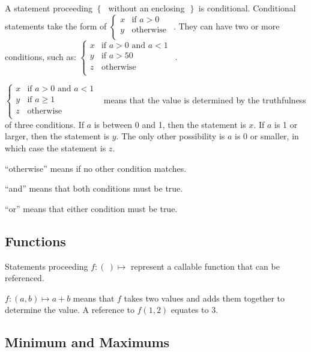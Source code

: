 \documentclass{article}
\begin{document}
\begin{sloppypar}
A statement proceeding \(\left\{ \  \right.\ \ \)without an
enclosing\(\left. \ \ \right\}\) is conditional. Conditional statements
take the form of \(\left\{ \begin{matrix}
x & \text{if\ }a > 0 \\
y & \text{otherwise} \\
\end{matrix} \right.\ \ \). They can have two or more conditions, such
as: \(\left\{ \begin{matrix}
x & \text{if\ }a > 0\text{\ and\ }a < 1 \\
y & \text{if\ }a > 50 \\
z & \text{otherwise} \\
\end{matrix} \right.\ \ \).

\(\left\{ \begin{matrix}
x & \text{if\ }a > 0\text{\ and\ }a < 1 \\
y & \text{if\ }a \geq 1 \\
z & \text{otherwise} \\
\end{matrix} \right.\ \ \) means that the value is determined by the
truthfulness of three conditions. If \(a\) is between 0 and 1, then the
statement is \(x\). If \(a\) is 1 or larger, then the statement is
\(y\). The only other possibility is \(a\) is 0 or smaller, in which
case the statement is \(z\).

``otherwise'' means if no other condition matches.

``and'' means that both conditions must be true.

``or'' means that either condition must be true.

\hypertarget{functions}{%
\subsection{Functions}\label{functions}}

Statements proceeding \(f:\left( \  \right) \mapsto\) represent a
callable function that can be referenced.

\(f:\left( a,b \right) \mapsto a + b\) means that \(f\) takes two values
and adds them together to determine the value. A reference to
\(f\left( 1,2 \right)\) equates to 3.

\hypertarget{minimum-and-maximums}{%
\subsection{Minimum and Maximums}\label{minimum-and-maximums}}


\end{sloppypar}
\end{document}

